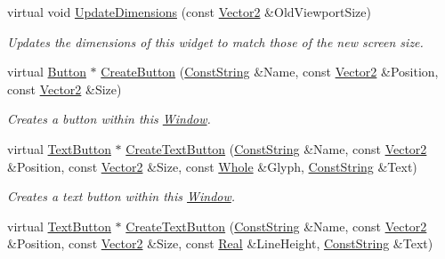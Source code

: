 \begin{DoxyCompactItemize}
virtual void \hyperlink{classphys_1_1UI_1_1Window_a0be6c93e5660757a5f94227f2e076ba9}{UpdateDimensions} (const \hyperlink{classphys_1_1Vector2}{Vector2} \&OldViewportSize)
\begin{DoxyCompactList}\small\item\em Updates the dimensions of this widget to match those of the new screen size. \item\end{DoxyCompactList}\item 
virtual \hyperlink{classphys_1_1UI_1_1Button}{Button} $\ast$ \hyperlink{classphys_1_1UI_1_1Window_aa387b73b0e518905cdabf11b620e69fd}{CreateButton} (\hyperlink{namespacephys_a5ce5049f8b4bf88d6413c47b504ebb31}{ConstString} \&Name, const \hyperlink{classphys_1_1Vector2}{Vector2} \&Position, const \hyperlink{classphys_1_1Vector2}{Vector2} \&Size)
\begin{DoxyCompactList}\small\item\em Creates a button within this \hyperlink{classphys_1_1UI_1_1Window}{Window}. \item\end{DoxyCompactList}\item 
virtual \hyperlink{classphys_1_1UI_1_1TextButton}{TextButton} $\ast$ \hyperlink{classphys_1_1UI_1_1Window_a88774c65d70e6860c26ac27ed2e6b312}{CreateTextButton} (\hyperlink{namespacephys_a5ce5049f8b4bf88d6413c47b504ebb31}{ConstString} \&Name, const \hyperlink{classphys_1_1Vector2}{Vector2} \&Position, const \hyperlink{classphys_1_1Vector2}{Vector2} \&Size, const \hyperlink{namespacephys_a460f6bc24c8dd347b05e0366ae34f34a}{Whole} \&Glyph, \hyperlink{namespacephys_a5ce5049f8b4bf88d6413c47b504ebb31}{ConstString} \&Text)
\begin{DoxyCompactList}\small\item\em Creates a text button within this \hyperlink{classphys_1_1UI_1_1Window}{Window}. \item\end{DoxyCompactList}\item 
virtual \hyperlink{classphys_1_1UI_1_1TextButton}{TextButton} $\ast$ \hyperlink{classphys_1_1UI_1_1Window_ae3f10d4ccdc2a8a031436cb57ce81f02}{CreateTextButton} (\hyperlink{namespacephys_a5ce5049f8b4bf88d6413c47b504ebb31}{ConstString} \&Name, const \hyperlink{classphys_1_1Vector2}{Vector2} \&Position, const \hyperlink{classphys_1_1Vector2}{Vector2} \&Size, const \hyperlink{namespacephys_af7eb897198d265b8e868f45240230d5f}{Real} \&LineHeight, \hyperlink{namespacephys_a5ce5049f8b4bf88d6413c47b504ebb31}{ConstString} \&Text)

\end{DoxyCompactItemize}
